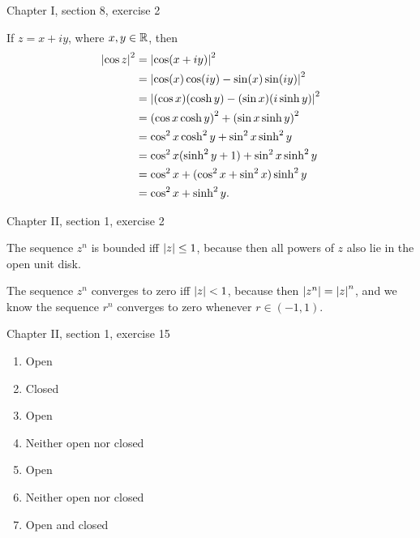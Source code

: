 \documentclass{article}
\begin{document}
\bigskip
\par
\begin{prob}
    Chapter I, section 8, exercise 2
\end{prob}
If $z=x+iy$, where $x,y \in \mathbb{R}$, then
\begin{align*}
    \left\lvert \cos z \right\rvert^2 &= \left\lvert \cos(x+iy) \right\rvert^2 \\
                   &= \left\lvert  \cos(x)\cos(iy)-\sin(x)\sin(iy)  \right\rvert^2 \\
                   &= \left\lvert  (\cos x)(\cosh y) - (\sin x)(i \sinh y)  \right\rvert^2 \\
                   &= \left( \cos x \cosh y \right)^2 + \left( \sin x \sinh y \right)^2 \\
                   &= \cos^2 x \cosh^2 y + \sin^2 x \sinh^2 y \\
                   &= \cos^2 x (\sinh^2 y + 1) + \sin^2 x \sinh^2 y \\
                   &= \cos^2 x + (\cos^2 x + \sin^2 x) \sinh^2 y \\
                   &= \cos^2 x + \sinh^2 y.
\end{align*}

\bigskip
\par
\begin{prob}
    Chapter II, section 1, exercise 2
\end{prob}
The sequence $z^n$ is bounded iff $ \left\lvert z \right\rvert\leq 1$, because then all powers of $z$ also lie in the open unit disk.
\par
The sequence $z^n$ converges to zero iff $\left\lvert z \right\rvert<1$, because then $\left\lvert z^n \right\rvert=\left\lvert z \right\rvert^n$, and we know the sequence $r^n$ converges to zero whenever $r \in (-1, 1)$.

\bigskip
\par
\begin{prob}
    Chapter II, section 1, exercise 15
\end{prob}
\begin{enumerate}[label=(\alph*)]
    \item Open
    \item Closed
    \item Open
    \item Neither open nor closed
    \item Open
    \item Neither open nor closed
    \item Open and closed
\end{enumerate}
\end{document}
